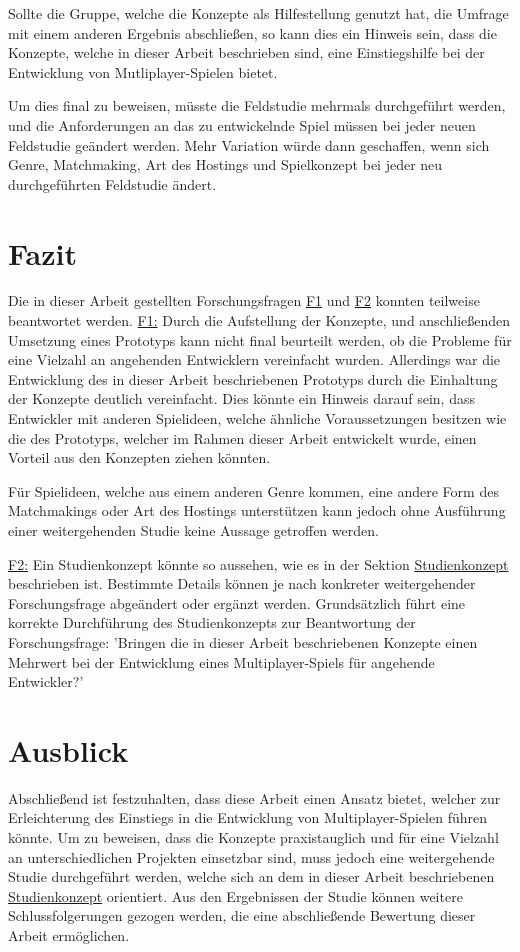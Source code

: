 Sollte die Gruppe, welche die Konzepte als Hilfestellung genutzt hat, die Umfrage mit einem anderen Ergebnis abschließen, so kann dies ein Hinweis sein, dass die Konzepte, welche in dieser Arbeit beschrieben sind, eine Einstiegshilfe bei der Entwicklung von Mutliplayer-Spielen bietet.

Um dies final zu beweisen, müsste die Feldstudie mehrmals durchgeführt werden, und die Anforderungen an das zu entwickelnde Spiel müssen bei jeder neuen Feldstudie geändert werden. Mehr Variation würde dann geschaffen, wenn sich Genre, Matchmaking, Art des Hostings und Spielkonzept bei jeder neu durchgeführten Feldstudie ändert.


\section{Fazit}

Die in dieser Arbeit gestellten Forschungsfragen \hyperref[f1]{F1} und \hyperref[f2]{F2} konnten teilweise beantwortet werden.
\hyperref[f1]{F1:} Durch die Aufstellung der Konzepte, und anschließenden Umsetzung eines Prototyps kann nicht final beurteilt werden, ob die Probleme für eine Vielzahl an angehenden Entwicklern vereinfacht wurden. Allerdings war die Entwicklung des in dieser Arbeit beschriebenen Prototyps durch die Einhaltung der Konzepte deutlich vereinfacht. Dies könnte ein Hinweis darauf sein, dass Entwickler mit anderen Spielideen, welche ähnliche Voraussetzungen besitzen wie die des Prototyps, welcher im Rahmen dieser Arbeit entwickelt wurde, einen Vorteil aus den Konzepten ziehen könnten.

Für Spielideen, welche aus einem anderen Genre kommen, eine andere Form des Matchmakings oder Art des Hostings unterstützen kann jedoch ohne Ausführung einer weitergehenden Studie keine Aussage getroffen werden.

\hyperref[f2]{F2:} Ein Studienkonzept könnte so aussehen, wie es in der Sektion \hyperref[studienkonzept]{Studienkonzept} beschrieben ist. Bestimmte Details können je nach konkreter weitergehender Forschungsfrage abgeändert oder ergänzt werden. Grundsätzlich führt eine korrekte Durchführung des Studienkonzepts zur Beantwortung der Forschungsfrage:
'Bringen die in dieser Arbeit beschriebenen Konzepte einen Mehrwert bei der Entwicklung eines Multiplayer-Spiels für angehende Entwickler?'

\section{Ausblick}

Abschließend ist festzuhalten, dass diese Arbeit einen Ansatz bietet, welcher zur Erleichterung des Einstiegs in die Entwicklung von Multiplayer-Spielen führen könnte. Um zu beweisen, dass die Konzepte praxistauglich und für eine Vielzahl an unterschiedlichen Projekten einsetzbar sind, muss jedoch eine weitergehende Studie durchgeführt werden, welche sich an dem in dieser Arbeit beschriebenen \hyperref[studienkonzept]{Studienkonzept} orientiert. Aus den Ergebnissen der Studie können weitere Schlussfolgerungen gezogen werden, die eine abschließende Bewertung dieser Arbeit ermöglichen.